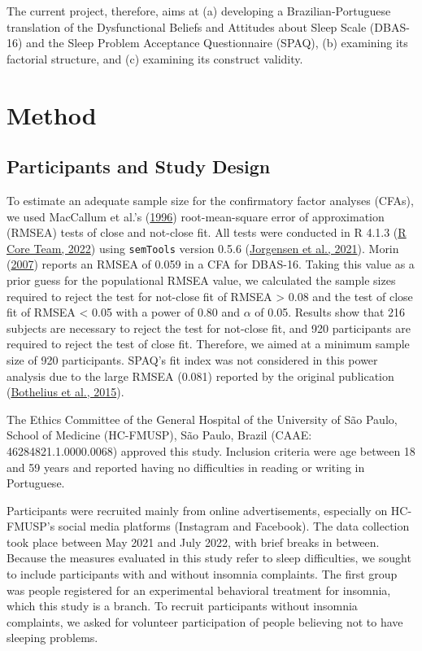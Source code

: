 \documentclass[
  ,doc,11pt, twoside,floatsintext]{apa6}
\begin{document}
The current project, therefore, aims at (a) developing a Brazilian-Portuguese translation of the Dysfunctional Beliefs and Attitudes about Sleep Scale (DBAS-16) and the Sleep Problem Acceptance Questionnaire (SPAQ), (b) examining its factorial structure, and (c) examining its construct validity.

\newpage

\hypertarget{method}{%
\section{Method}\label{method}}

\hypertarget{participants-and-study-design}{%
\subsection{Participants and Study Design}\label{participants-and-study-design}}

To estimate an adequate sample size for the confirmatory factor analyses (CFAs), we used MacCallum et al.'s (\protect\hyperlink{ref-maccallum1996}{1996}) root-mean-square error of approximation (RMSEA) tests of close and not-close fit. All tests were conducted in R 4.1.3 (\protect\hyperlink{ref-R-base}{R Core Team, 2022}) using \texttt{semTools} version 0.5.6 (\protect\hyperlink{ref-semtools}{Jorgensen et al., 2021}). Morin (\protect\hyperlink{ref-morin2007a}{2007}) reports an RMSEA of 0.059 in a CFA for DBAS-16. Taking this value as a prior guess for the populational RMSEA value, we calculated the sample sizes required to reject the test for not-close fit of RMSEA \textgreater{} 0.08 and the test of close fit of RMSEA \textless{} 0.05 with a power of 0.80 and \(\alpha\) of 0.05. Results show that 216 subjects are necessary to reject the test for not-close fit, and 920 participants are required to reject the test of close fit. Therefore, we aimed at a minimum sample size of 920 participants. SPAQ's fit index was not considered in this power analysis due to the large RMSEA (0.081) reported by the original publication (\protect\hyperlink{ref-bothelius2015}{Bothelius et al., 2015}).

The Ethics Committee of the General Hospital of the University of São Paulo, School of Medicine (HC-FMUSP), São Paulo, Brazil (CAAE: 46284821.1.0000.0068) approved this study. Inclusion criteria were age between 18 and 59 years and reported having no difficulties in reading or writing in Portuguese.

Participants were recruited mainly from online advertisements, especially on HC-FMUSP's social media platforms (Instagram and Facebook). The data collection took place between May 2021 and July 2022, with brief breaks in between. Because the measures evaluated in this study refer to sleep difficulties, we sought to include participants with and without insomnia complaints. The first group was people registered for an experimental behavioral treatment for insomnia, which this study is a branch. To recruit participants without insomnia complaints, we asked for volunteer participation of people believing not to have sleeping problems.
\end{document}

